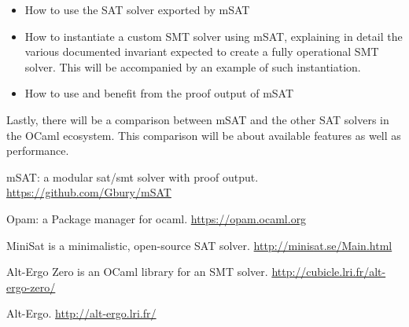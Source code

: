 \documentclass{llncs}
\def\msat{\textsf{mSAT}}
\begin{document}
\begin{itemize}
  \item How to use the SAT solver exported by \msat{}
  \item How to instantiate a custom SMT solver using \msat{}, explaining in
    detail the various documented invariant expected to create a fully
    operational SMT solver. This will be accompanied by an example of such
    instantiation.
  \item How to use and benefit from the proof output of \msat{}
\end{itemize}

Lastly, there will be a comparison between \msat{} and the other SAT solvers
in the OCaml ecosystem. This comparison will be about available features
as well as performance.


\begin{thebibliography}{1}

    \msat{}: a modular sat/smt solver with proof output.
    \url{https://github.com/Gbury/mSAT}

    Opam: a Package manager for ocaml.
    \url{https://opam.ocaml.org}

    MiniSat is a minimalistic, open-source SAT solver.
    \url{http://minisat.se/Main.html}

    Alt-Ergo Zero is an OCaml library for an SMT solver.
    \url{http://cubicle.lri.fr/alt-ergo-zero/}

    Alt-Ergo.
    \url{http://alt-ergo.lri.fr/}

\end{thebibliography}
\end{document}
